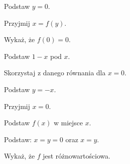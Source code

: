 
\begin{hints_list}
	\item Podstaw $y = 0$.
	\item Przyjmij $x = f(y)$.
	\item Wykaż, że $f(0) = 0$.
	\item Podstaw $1 - x$ pod $x$.
	\item Skorzystaj z danego równania dla $x = 0$.
	\item Podstaw $y = -x$.
	\item Przyjmij $x = 0$.
	\item Podstaw $f(x)$ w miejsce $x$.
	\item Podstaw: $x = y = 0$ oraz $x = y$.
	\item Wykaż, że $f$ jest różnowartościowa.
\end{hints_list}